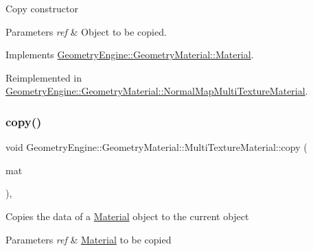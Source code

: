 Copy constructor 
\begin{DoxyParams}{Parameters}
{\em ref} & Object to be copied. \\
\hline
\end{DoxyParams}


Implements \mbox{\hyperlink{class_geometry_engine_1_1_geometry_material_1_1_material_ae5513ff06d536365e18ddc5e07e79784}{Geometry\+Engine\+::\+Geometry\+Material\+::\+Material}}.



Reimplemented in \mbox{\hyperlink{class_geometry_engine_1_1_geometry_material_1_1_normal_map_multi_texture_material_a38df455f7369f68ea2fc6abf31488c40}{Geometry\+Engine\+::\+Geometry\+Material\+::\+Normal\+Map\+Multi\+Texture\+Material}}.

\mbox{\label{class_geometry_engine_1_1_geometry_material_1_1_multi_texture_material_add208366ae882ad1bd9c6029969902b4}} 
\subsubsection{\texorpdfstring{copy()}{copy()}}
{\footnotesize\ttfamily void Geometry\+Engine\+::\+Geometry\+Material\+::\+Multi\+Texture\+Material\+::copy (\begin{DoxyParamCaption}\item[{const \mbox{\hyperlink{class_geometry_engine_1_1_geometry_material_1_1_multi_texture_material}{Multi\+Texture\+Material}} \&}]{mat }\end{DoxyParamCaption})\hspace{0.3cm}{\ttfamily [protected]}, {\ttfamily [virtual]}}

Copies the data of a \mbox{\hyperlink{class_geometry_engine_1_1_geometry_material_1_1_material}{Material}} object to the current object 
\begin{DoxyParams}{Parameters}
{\em ref} & \mbox{\hyperlink{class_geometry_engine_1_1_geometry_material_1_1_material}{Material}} to be copied \\
\hline
\end{DoxyParams}
\mbox{\label{class_geometry_engine_1_1_geometry_material_1_1_multi_texture_material_af6edaa5960d07b6abee870760e869189}} 
